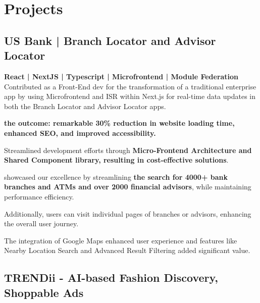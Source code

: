 \documentclass[letterpaper]{deedy-resume} %
\begin{document}
\begin{minipage}[t]{0.66\textwidth}
\sectionspace %







\section{Projects}

\subsection{US Bank | Branch Locator\href{https://www.usbank.com/locations/search/}{\faExternalLink} and Advisor Locator\href{https://www.usbank.com/wealth-management/find-an-advisor/}{\faExternalLink}}

\textbf{React | NextJS | Typescript | Microfrontend | Module Federation}  \\
Contributed as a Front-End dev for the transformation of a traditional enterprise app by using Microfrontend and ISR within Next.js for real-time data updates in both the Branch Locator and Advisor Locator apps.

\textbf{the outcome: remarkable 30\% reduction in website loading time, enhanced SEO, and improved accessibility.}

Streamlined development efforts through \textbf{Micro-Frontend Architecture and Shared Component library, resulting in cost-effective solutions}.

showcased our excellence by
streamlining \textbf{the search for 4000+ bank branches and
ATMs and over 2000 financial advisors}, while maintaining performance efficiency.

Additionally, users can visit individual pages of branches or advisors, enhancing the overall user journey.

The integration of Google Maps enhanced user
experience and features like Nearby Location Search
and Advanced Result Filtering added significant value.


\sectionspace %

\subsection{TRENDii\href{https://www.usbank.com/locations/search/}{\faExternalLink} - AI-based Fashion Discovery, Shoppable Ads}



\end{minipage}
\end{document}
